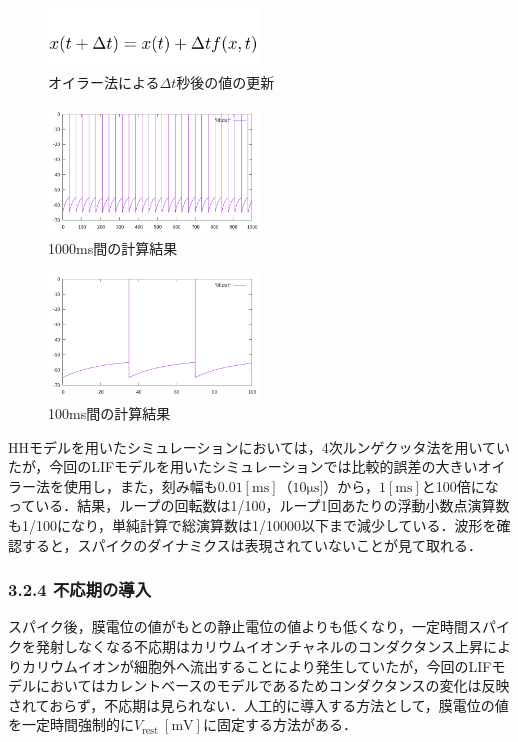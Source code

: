 \documentclass[dvipdfmx, A4j, twocolumn, 10.5pt]{jsarticle}
\begin{document}
\begin{figure}[h]
    \centering
    \includegraphics[width=0.5\textwidth]{images/euler.png}
    \caption{オイラー法による$\Delta t$秒後の値の更新}
\end{figure}

\begin{figure}[h]
    \centering
    \includegraphics[width=0.5\textwidth]{images/lif.pdf}
    \caption{1000ms間の計算結果}
\end{figure}

\begin{figure}[h]
    \centering
    \includegraphics[width=0.5\textwidth]{images/lif_100ms.pdf}
    \caption{100ms間の計算結果}
\end{figure}

HHモデルを用いたシミュレーションにおいては，4次ルンゲクッタ法を用いていたが，今回のLIFモデルを用いたシミュレーションでは比較的誤差の大きいオイラー法を使用し，また，刻み幅も$0.01[\mathrm{ms}]$（$10\mathrm{\mu s}]$）から，$1[\mathrm{ms}]$と100倍になっている．結果，ループの回転数は1/100，ループ1回あたりの浮動小数点演算数も1/100になり，単純計算で総演算数は1/10000以下まで減少している．波形を確認すると，スパイクのダイナミクスは表現されていないことが見て取れる．

\subsubsection*{3.2.4 不応期の導入}
スパイク後，膜電位の値がもとの静止電位の値よりも低くなり，一定時間スパイクを発射しなくなる不応期はカリウムイオンチャネルのコンダクタンス上昇によりカリウムイオンが細胞外へ流出することにより発生していたが，今回のLIFモデルにおいてはカレントベースのモデルであるためコンダクタンスの変化は反映されておらず，不応期は見られない．人工的に導入する方法として，膜電位の値を一定時間強制的に$V_{\text {rest }}[\mathrm{mV}]$に固定する方法がある．
\end{document}
